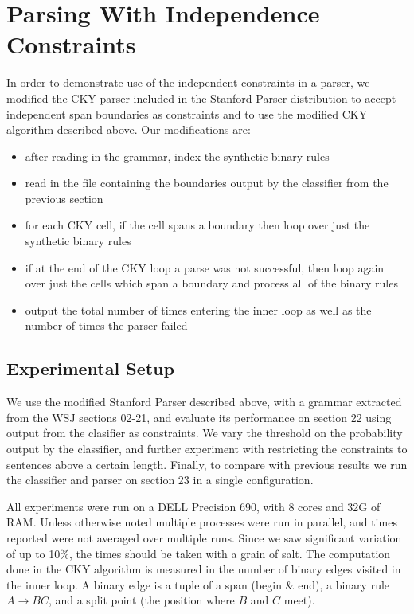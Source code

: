 \documentclass[11pt]{article}
\begin{document}
\section{Parsing With Independence Constraints}
\label{sec-5}
\label{sec:parser}

In order to demonstrate use of the independent constraints in a
parser, we modified the CKY parser included in the Stanford Parser
distribution to accept independent span boundaries as constraints and
to use the modified CKY algorithm described above. Our modifications
are:

\begin{itemize}
\item after reading in the grammar, index the synthetic binary rules
\item read in the file containing the boundaries output by the classifier
from the previous section
\item for each CKY cell, if the cell spans a boundary then loop over just
the synthetic binary rules
\item if at the end of the CKY loop a parse was not successful, then loop
again over just the cells which span a boundary and process all of
the binary rules
\item output the total number of times entering the inner loop as well as the
number of times the parser failed
\end{itemize}

\subsection{Experimental Setup}
\label{sec-5-1}

We use the modified Stanford Parser described above, with a grammar
extracted from the WSJ sections 02-21, and evaluate its performance on
section 22 using output from the clasifier as constraints. We vary the
threshold on the probability output by the classifier, and further
experiment with restricting the constraints to sentences above a
certain length. Finally, to compare with previous results we run the
classifier and parser on section 23 in a single configuration.

All experiments were run on a DELL Precision 690, with 8 cores and 32G
of RAM. Unless otherwise noted multiple processes were run in
parallel, and times reported were not averaged over multiple runs.
Since we saw significant variation of up to 10\%, the times should be
taken with a grain of salt. The computation done in the CKY algorithm
is measured in the number of binary edges visited in the inner loop. A
binary edge is a tuple of a span (begin \& end), a binary rule $A →
BC$, and a split point (the position where $B$ and $C$ meet).
\end{document}
